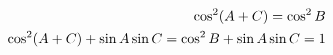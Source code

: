 \documentclass[preview]{standalone}
\begin{document}
\begin{align*}
\special{dvisvgm:raw <g id='unique000'>}\cos^2(A+C) = \cos^2 B\\ \special{dvisvgm:raw </g>}\special{dvisvgm:raw <g id='unique001'>}\cos^2(A+C)+\sin A\sin C=\cos^2 B+\sin A\sin C=1\special{dvisvgm:raw </g>}
\end{align*}
\end{document}
